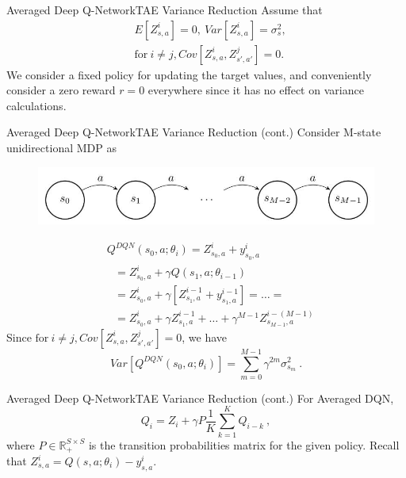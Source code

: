 \documentclass{beamer}
\begin{document}
\begin{frame}{Averaged Deep Q-Network}{TAE Variance Reduction}
Assume that
\begin{equation}
\begin{aligned}
	&E[Z_{s,a}^i] = 0,~ Var[Z_{s,a}^i] = \sigma_s^2, \\
	&\text{for}~ i \neq j, Cov[Z_{s,a}^i, Z_{s',a'}^j] = 0.
\end{aligned}
\end{equation}
We consider a fixed policy for updating the target values, and conveniently consider a zero reward $r=0$ everywhere since it has no effect on variance calculations.
\end{frame}


\begin{frame}{Averaged Deep Q-Network}{TAE Variance Reduction (cont.)}
Consider M-state unidirectional MDP as
\begin{figure}[t]
	\includegraphics[width=0.6\columnwidth]{figures/m-mdp.jpg}
\end{figure}

\begin{equation}
\begin{aligned}
	& Q^{DQN}(s_0, a; \theta_i) = Z_{s_0,a}^i + y_{s_0,a}^i \\
	& ~~~ = Z_{s_0,a}^i + \gamma Q(s_1, a; \theta_{i-1}) \\
	& ~~~ = Z_{s_0,a}^i + \gamma [Z_{s_1,a}^{i-1} + y_{s_1,a}^{i-1}] = \ldots = \\
	& ~~~ = Z_{s_0,a}^i + \gamma Z_{s_1,a}^{i-1} + \ldots + \gamma^{M-1} Z_{s_{M-1},a}^{i-(M-1)}
\end{aligned}
\end{equation}
Since $\text{for}~ i \neq j, Cov[Z_{s,a}^i, Z_{s',a'}^j] = 0$, we have
\begin{equation}
	Var[Q^{DQN}(s_0, a; \theta_i)] = \sum_{m=0}^{M-1}\gamma^{2m}\sigma_{s_m}^2 ~.
\end{equation}
\end{frame}

\begin{frame}{Averaged Deep Q-Network}{TAE Variance Reduction (cont.)}
For Averaged DQN,
\begin{equation}
Q_i = Z_i + \gamma P\frac{1}{K} \sum_{k=1}^{K} Q_{i-k} ~,
\end{equation}
where $P \in \mathbb{R}_+^{S\times S}$ is the transition probabilities matrix for the given policy.
Recall that $Z_{s,a}^i = Q(s,a; \theta_i) - y_{s,a}^i $.
\end{frame}
\end{document}
